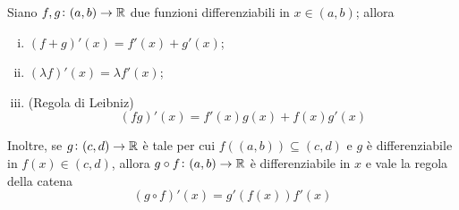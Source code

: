 \begin{theorem}
    \label{th:6.2}
    Siano $f,g\colon (a,b)\to \amsbb{R}$ due funzioni differenziabili in $x\in(a,b)$; allora
    \begin{enumerate}[(i)]
        \item $(f+g)'(x) = f'(x) + g'(x)$;
        \item $(\lambda f)'(x) = \lambda f'(x)$;
        \item (Regola di Leibniz)
        \begin{equation}
            \label{eq:6.3}
            (fg)'(x) = f'(x)g(x) + f(x)g'(x)
        \end{equation}
    \end{enumerate}
    Inoltre, se $g\colon (c,d) \to \amsbb{R}$ è tale per cui $f((a,b))\subseteq (c,d)$ e $g$ è differenziabile in $f(x)\in(c,d)$, allora $g\circ f \colon (a,b) \to \amsbb{R}$ è differenziabile in $x$ e vale la regola della catena
    \begin{equation}
        \label{eq:6.4}
        (g\circ f)'(x) = g'(f(x))f'(x)
    \end{equation}
\end{theorem}
